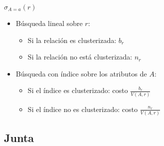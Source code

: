 \documentclass[a4paper, twoside]{article}
\begin{document}
$\sigma_{A=a}(r)$
\begin{itemize}
\item Búsqueda lineal sobre $r$:

\begin{itemize}
\item Si la relación es clusterizada: $b_{r}$
\item Si la relación no está clusterizada: $n_{r}$
\end{itemize}
\item Búsqueda con índice sobre los atributos de $A$:

\begin{itemize}
\item Si el índice es clusterizado: costo $\frac{b_{r}}{V(A,r)}$
\item Si el índice no es clusterizado: costo $\frac{n_{r}}{V(A,r)}$
\end{itemize}
\end{itemize}

\subsection{Junta}
\end{document}
